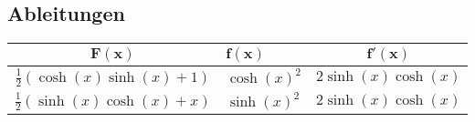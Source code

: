 \documentclass[a4paper,10pt]{article}
\begin{document}
\subsection{Ableitungen}
\begin{center}
  \begin{tabularx}{\linewidth}{c>{\centering\arraybackslash}Xc}
  \toprule
  $\mathbf{F(x)}$ & $\mathbf{f(x)}$ & $\mathbf{f'(x)}$ \\
  \midrule
  $\frac{1}{2}(\cosh(x)\sinh(x)+1)$ & $\cosh(x)^2$ & $2\sinh(x)\cosh(x)$\\
  $\frac{1}{2}(\sinh(x)\cosh(x) + x)$ & $\sinh(x)^2$ & $2\sinh(x)\cosh(x)$\\

  \bottomrule
  \end{tabularx}
\end{center}
\end{document}
